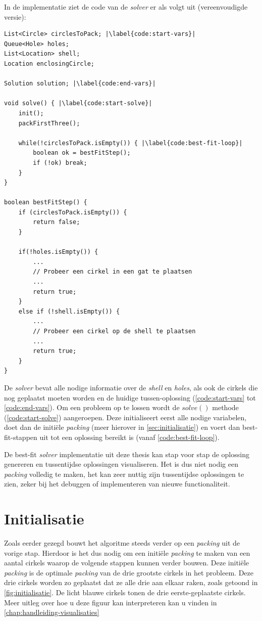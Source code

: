 \documentclass[12pt,a4paper,oneside]{book}
\begin{document}
In de implementatie ziet de code van de \textit{solver} er als volgt uit (vereenvoudigde versie):

\begin{lstlisting}
List<Circle> circlesToPack; |\label{code:start-vars}|
Queue<Hole> holes;
List<Location> shell;
Location enclosingCircle;

Solution solution; |\label{code:end-vars}|

void solve() { |\label{code:start-solve}|
	init();
	packFirstThree();
	
	while(!circlesToPack.isEmpty()) { |\label{code:best-fit-loop}|
		boolean ok = bestFitStep();
		if (!ok) break;
	}
}

boolean bestFitStep() {
	if (circlesToPack.isEmpty()) {
		return false;
	}
	
	if(!holes.isEmpty()) {
		...
		// Probeer een cirkel in een gat te plaatsen
		...
		return true;
	}
	else if (!shell.isEmpty()) {
		...
		// Probeer een cirkel op de shell te plaatsen
		...
		return true;
	}
}
\end{lstlisting}

De \textit{solver} bevat alle nodige informatie over de \textit{shell} en \textit{holes}, als ook de cirkels die nog geplaatst moeten worden en de huidige tussen-oplossing (\autoref{code:start-vars} tot \autoref{code:end-vars}).
Om een probleem op te lossen wordt de $solve()$ methode (\autoref{code:start-solve}) aangeroepen.
Deze initialiseert eerst alle nodige variabelen, doet dan de initiële \textit{packing} (meer hierover in \autoref{sec:initialisatie}) en voert dan best-fit-stappen uit tot een oplossing bereikt is (vanaf \autoref{code:best-fit-loop}).

De best-fit \textit{solver} implementatie uit deze thesis kan stap voor stap de oplossing genereren en tussentijdse oplossingen visualiseren.
Het is dus niet nodig een \textit{packing} volledig te maken, het kan zeer nuttig zijn tussentijdse oplossingen te zien, zeker bij het debuggen of implementeren van nieuwe functionaliteit.

\section{Initialisatie} \label{sec:initialisatie}

Zoals eerder gezegd bouwt het algoritme steeds verder op een \textit{packing} uit de vorige stap.
Hierdoor is het dus nodig om een initiële \textit{packing} te maken van een aantal cirkels waarop de volgende stappen kunnen verder bouwen.
Deze initiële \textit{packing} is de optimale \textit{packing} van de drie grootste cirkels in het probleem.
Deze drie cirkels worden zo geplaatst dat ze alle drie aan elkaar raken, zoals getoond in \autoref{fig:initialisatie}.
De licht blauwe cirkels tonen de drie eerste-geplaatste cirkels.
Meer uitleg over hoe u deze figuur kan interpreteren kan u vinden in \autoref{chap:handleiding-visualisaties}
\end{document}
